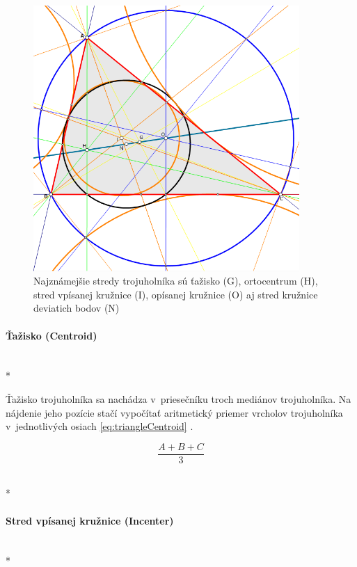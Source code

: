 \begin{figure}[H]
	\centering
	\includegraphics[width=0.9\textwidth]{obrazky-figures/Trigonometric_centres.png}
	\caption{Najznámejšie stredy trojuholníka sú ťažisko (G), ortocentrum (H), stred vpísanej kružnice (I), opísanej kružnice (O) aj stred kružnice deviatich bodov (N) \cite{triangle_center_2012}}
	\label{fig:TriangleCenters}
\end{figure}


\paragraph{Ťažisko (Centroid)}\unskip \mbox{} \\*

Ťažisko trojuholníka sa nachádza v~priesečníku troch mediánov trojuholníka. Na nájdenie jeho pozície stačí vypočítať aritmetický priemer vrcholov trojuholníka v~jednotlivých osiach \ref{eq:triangleCentroid} \cite{Centroid_of_a_Triangle}.



\begin{equation}
    \frac{A+B+C}{3}
    \label{eq:triangleCentroid}
\end{equation}

 \mbox{} \\*
\paragraph{Stred vpísanej kružnice (Incenter)}\unskip \mbox{} \\*
\label{sec:TriangleCenter}

